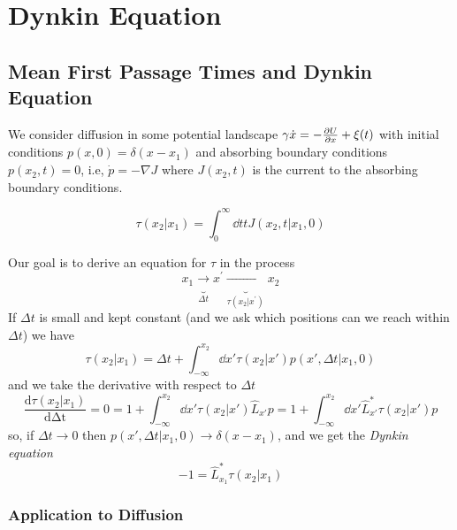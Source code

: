 \documentclass{notebook}
\begin{document}
\chapter{Dynkin Equation}

\section{Mean First Passage Times and Dynkin Equation}

We consider diffusion in some potential landscape $\gamma \dot{x} = - \pdv{U}{x} + \xi(t)$ with initial conditions $p(x,0) = \delta(x-x_1)$ and absorbing boundary conditions $p(x_2,t) = 0$, i.e, $\dot{p} = -\nabla J$ where $J(x_2,t)$ is the current to the absorbing boundary conditions.

\begin{theorem}
	\begin{equation}
	\tau(x_2|x_1) = \int_0^{\infty} \dd{t} t J(x_2,t|x_1,0)
	\end{equation}
\end{theorem}

Our goal is to derive an equation for $\tau$ in the process 
%
\begin{equation}
	x_1 \underbrace{\longrightarrow}_{\Delta t} x^\prime \underbrace{\longrightarrow}_{\tau(x_2| x^\prime)} x_2
\end{equation}
%
If $\Delta t$ is small and kept constant (and we ask which positions can we reach within $\Delta t$) we have
%
\begin{equation}
	\tau(x_2|x_1) = \Delta t + \int_{-\infty}^{x_2} \dd{x'} \tau(x_2|x') p(x',\Delta t|x_1,0)
\end{equation}
%
and we take the derivative with respect to $\Delta t$
%
\begin{equation}
	\frac{\mathrm{d} \tau(x_2|x_1)}{\mathrm{d \Delta t}} = 
	0 = 1 + \int_{-\infty}^{x_2} \dd{x'} \tau(x_2|x') \hat{L}_{x'} p = 1 + \int_{-\infty}^{x_2} \dd{x'} \hat{L}^*_{x'} \tau(x_2|x') p
\end{equation}
%
so, if $\Delta t \to 0$ then $p(x',\Delta t|x_1,0) \to \delta(x-x_1)$,
and we get the \textit{Dynkin equation}
%
\begin{equation}
-1 = \hat{L}^*_{x_1} \tau(x_2|x_1)
\end{equation}
%

\subsection*{Application to Diffusion}
\end{document}

